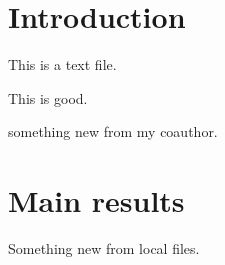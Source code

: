 \documentclass{article}
\begin{document}
\section{Introduction}%
\label{sec:introduction}


This is a text file. 


This is good. 

something new from my coauthor. 




\section{Main results}%
\label{sec:main_results}

Something new from local files. 
\end{document}
